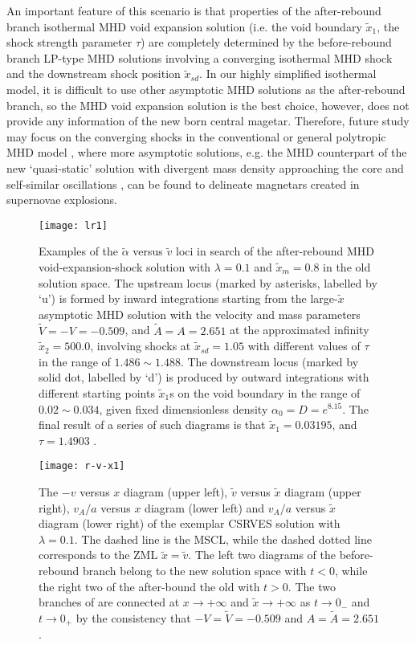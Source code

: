\documentclass[fleqn,usenatbib]{mnras}
\begin{document}
An important feature of this scenario is that properties of the after-rebound branch isothermal MHD void expansion solution (i.e. the void boundary $\widetilde{x}_{1}$, the shock strength parameter $\tau$) are completely determined by the before-rebound branch LP-type MHD solutions involving a converging isothermal MHD shock and the downstream shock position $\widetilde{x}_{sd}$. In our highly simplified isothermal model, it is difficult to use other asymptotic MHD solutions as the after-rebound branch, so the MHD void expansion solution is the best choice, however, does not provide any information of the new born central magetar. Therefore, future study may focus on the converging shocks in the conventional or general polytropic MHD model \citep{wang2008dynamic, lou2010general}, where more asymptotic solutions, e.g. the MHD counterpart of the new ‘quasi-static’ solution with divergent mass density approaching the core and self-similar oscillations \citep{lou2006new}, can be found to delineate magnetars created in supernovae explosions.

\begin{figure}
\centering
\texttt{[image: lr1]}
\caption{Examples of the $\widetilde{\alpha}$ versus $\widetilde{v}$ loci in search of the after-rebound MHD void-expansion-shock solution with $\lambda=0.1$ and $\widetilde{x}_{m}=0.8$ in the old solution space. The upstream locus (marked by asterisks, labelled by `u') is formed by inward integrations starting from the large-$\widetilde{x}$ asymptotic MHD solution with the velocity and mass parameters $\widetilde{V}=-V=-0.509$, and $\widetilde{A}=A=2.651$ at the approximated infinity $\widetilde{x}_{2}=500.0$, involving shocks at $\widetilde{x}_{sd}=1.05$ with different values of $\tau$ in the range of $1.486\sim 1.488$. The downstream locus (marked by solid dot, labelled by `d') is produced by outward integrations with different starting points $\widetilde{x}_{1}$s on the void boundary in the range of $0.02\sim 0.034$, given fixed dimensionless density $\alpha_{0}=D=e^{8.15}$. The final result of a series of such diagrams is that $\widetilde{x}_{1}=0.03195$, and $\tau=1.4903$ .}
\label{fa2}
\end{figure}

\begin{figure}
\centering
\texttt{[image: r-v-x1]}
\caption{The $-v$ versus $x$ diagram (upper left), $\widetilde{v}$ versus $\widetilde{x}$ diagram (upper right), $v_{A}/a$ versus $x$ diagram (lower left) and $v_{A}/a$ versus $\widetilde{x}$ diagram (lower right) of the exemplar CSRVES solution with $\lambda=0.1$. The dashed line is the MSCL, while the dashed dotted line corresponds to the ZML $\widetilde{x}=\widetilde{v}$. The left two diagrams of the before-rebound branch belong to the new solution space with $t<0$, while the right two of the after-bound the old with $t>0$. The two branches of are connected at $x\rightarrow +\infty$ and $\widetilde{x}\rightarrow +\infty$ as $t\rightarrow 0_{-}$ and $t\rightarrow 0_{+}$ by the consistency that $-V=\widetilde{V}=-0.509$ and $A=\widetilde{A}=2.651$.}
\label{fa3}
\end{figure}
\end{document}
